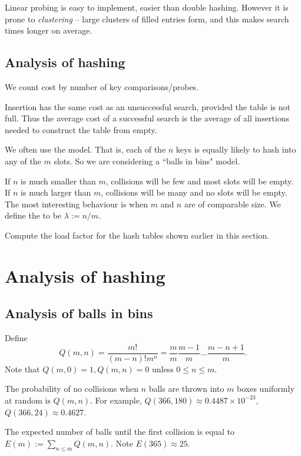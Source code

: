 Linear probing is easy to implement, easier than double hashing.
However it is prone to \emph{clustering} -- large clusters of filled entries form, 
and this makes search times longer on average.

\section{Analysis of hashing}
We count cost by number of key comparisons/probes.

Insertion has the same cost as an unsuccessful search, provided the table is not full.
Thus the average cost of a successful search is the average of all insertions needed to construct the table from empty.

We often use the  model. 
That is, each of the $n$ keys is equally likely to hash into any of the $m$ slots. 
So we are considering a ``balls in bins" model.

If $n$ is much smaller than $m$, collisions will be few and most slots will be empty. 
If $n$ is much larger than $m$, collisions will be many and no slots will be empty. 
The most interesting behaviour is when $m$ and $n$ are of comparable size. 
We define the  to be $\lambda := n/m$. 

\begin{Boxample}[4]
Compute the load factor for the hash tables shown earlier in this section.
\end{Boxample}


\chapter{Analysis of hashing} %

\section{Analysis of balls in bins}
Define 
$$Q(m, n) = \frac{m!}{(m-n)! m^n} = \frac{m}{m} \frac{m-1}{m} \dots 
\frac{m - n + 1}{m}\text{.}$$
Note that $Q(m,0) = 1, Q(m, n) = 0$ unless $0 \leq n \leq m$.

The probability of no collisions when $n$ balls are thrown into $m$ boxes 
uniformly at random is $Q(m, n)$. For example, $Q(366, 180) \approx 0.4487
 \times 10^{-23}$, $Q(366, 24) \approx  0.4627$. 

The expected number of balls until the first collision is equal to 
$E(m):=\sum_{n \leq m} Q(m, n)$. Note $E(365) \approx 25$.


